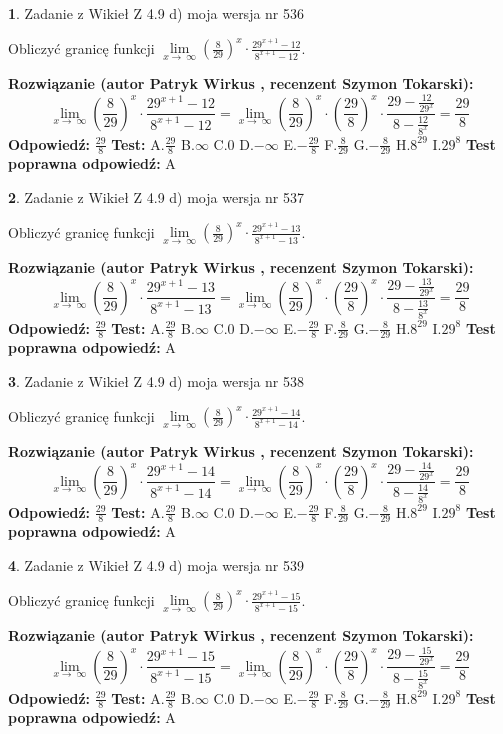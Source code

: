 \documentclass[12pt, a4paper]{article}
\theoremstyle{definition} %
\newtheorem{zad}{}
\newcommand{\zadStart}[1]{\begin{zad}#1\newline}
\newcommand{\zadStop}{\end{zad}}
\newcommand{\rozwStart}[2]{\noindent \textbf{Rozwiązanie (autor #1 , recenzent #2): }\newline}
\newcommand{\rozwStop}{\newline}
\newcommand{\odpStart}{\noindent \textbf{Odpowiedź:}\newline}
\newcommand{\odpStop}{\newline}
\newcommand{\testStart}{\noindent \textbf{Test:}\newline}
\newcommand{\testStop}{\newline}
\newcommand{\kluczStart}{\noindent \textbf{Test poprawna odpowiedź:}\newline}
\newcommand{\kluczStop}{\newline}
\begin{document}
\zadStart{Zadanie z Wikieł Z 4.9 d) moja wersja nr 536}


Obliczyć granicę funkcji  $\lim\limits_{x\to\ \infty}(\frac{8}{29})^{x}\cdot\frac{29^{x+1}-12}{8^{x+1}-12}$.
\zadStop
\rozwStart{Patryk Wirkus}{Szymon Tokarski}
$$\lim\limits_{x\to\ \infty}(\frac{8}{29})^{x}\cdot\frac{29^{x+1}-12}{8^{x+1}-12}=\lim\limits_{x\to\ \infty}(\frac{8}{29})^{x}\cdot(\frac{29}{8})^{x} \cdot \frac{29-\frac{12}{29^{x}}}{8-\frac{12}{8^{x}}} = \frac{29}{8}$$
\rozwStop
\odpStart
$\frac{29}{8}$
\odpStop
\testStart
A.$\frac{29}{8}$ B.$\infty$ C.$0$ D.$-\infty$ E.$-\frac{29}{8}$
F.$\frac{8}{29}$ G.$-\frac{8}{29}$
H.$8^{29}$
I.$29^{8}$
\testStop
\kluczStart
A
\kluczStop



\zadStart{Zadanie z Wikieł Z 4.9 d) moja wersja nr 537}


Obliczyć granicę funkcji  $\lim\limits_{x\to\ \infty}(\frac{8}{29})^{x}\cdot\frac{29^{x+1}-13}{8^{x+1}-13}$.
\zadStop
\rozwStart{Patryk Wirkus}{Szymon Tokarski}
$$\lim\limits_{x\to\ \infty}(\frac{8}{29})^{x}\cdot\frac{29^{x+1}-13}{8^{x+1}-13}=\lim\limits_{x\to\ \infty}(\frac{8}{29})^{x}\cdot(\frac{29}{8})^{x} \cdot \frac{29-\frac{13}{29^{x}}}{8-\frac{13}{8^{x}}} = \frac{29}{8}$$
\rozwStop
\odpStart
$\frac{29}{8}$
\odpStop
\testStart
A.$\frac{29}{8}$ B.$\infty$ C.$0$ D.$-\infty$ E.$-\frac{29}{8}$
F.$\frac{8}{29}$ G.$-\frac{8}{29}$
H.$8^{29}$
I.$29^{8}$
\testStop
\kluczStart
A
\kluczStop



\zadStart{Zadanie z Wikieł Z 4.9 d) moja wersja nr 538}


Obliczyć granicę funkcji  $\lim\limits_{x\to\ \infty}(\frac{8}{29})^{x}\cdot\frac{29^{x+1}-14}{8^{x+1}-14}$.
\zadStop
\rozwStart{Patryk Wirkus}{Szymon Tokarski}
$$\lim\limits_{x\to\ \infty}(\frac{8}{29})^{x}\cdot\frac{29^{x+1}-14}{8^{x+1}-14}=\lim\limits_{x\to\ \infty}(\frac{8}{29})^{x}\cdot(\frac{29}{8})^{x} \cdot \frac{29-\frac{14}{29^{x}}}{8-\frac{14}{8^{x}}} = \frac{29}{8}$$
\rozwStop
\odpStart
$\frac{29}{8}$
\odpStop
\testStart
A.$\frac{29}{8}$ B.$\infty$ C.$0$ D.$-\infty$ E.$-\frac{29}{8}$
F.$\frac{8}{29}$ G.$-\frac{8}{29}$
H.$8^{29}$
I.$29^{8}$
\testStop
\kluczStart
A
\kluczStop



\zadStart{Zadanie z Wikieł Z 4.9 d) moja wersja nr 539}


Obliczyć granicę funkcji  $\lim\limits_{x\to\ \infty}(\frac{8}{29})^{x}\cdot\frac{29^{x+1}-15}{8^{x+1}-15}$.
\zadStop
\rozwStart{Patryk Wirkus}{Szymon Tokarski}
$$\lim\limits_{x\to\ \infty}(\frac{8}{29})^{x}\cdot\frac{29^{x+1}-15}{8^{x+1}-15}=\lim\limits_{x\to\ \infty}(\frac{8}{29})^{x}\cdot(\frac{29}{8})^{x} \cdot \frac{29-\frac{15}{29^{x}}}{8-\frac{15}{8^{x}}} = \frac{29}{8}$$
\rozwStop
\odpStart
$\frac{29}{8}$
\odpStop
\testStart
A.$\frac{29}{8}$ B.$\infty$ C.$0$ D.$-\infty$ E.$-\frac{29}{8}$
F.$\frac{8}{29}$ G.$-\frac{8}{29}$
H.$8^{29}$
I.$29^{8}$
\testStop
\kluczStart
A
\kluczStop
\end{document}
